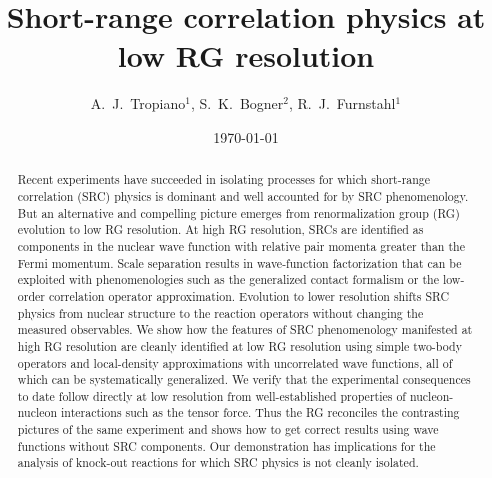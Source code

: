 \documentclass[10pt,aps,prc,floatfix,twocolumn,nofootinbib]{revtex4-1}
\begin{document}
\title{Short-range correlation physics at low RG resolution}


\author{A.~J.~Tropiano$^{1}$, S.~K.~Bogner$^{2}$, R.~J.~Furnstahl$^{1}$}


\date{\today}

\begin{abstract}
Recent experiments have succeeded in isolating processes for which short-range correlation (SRC) physics is dominant and well accounted for by SRC phenomenology.
But an alternative and compelling picture emerges from renormalization group (RG) evolution to low RG resolution.
At high RG resolution, SRCs are identified as components in the nuclear wave function with relative pair momenta greater than the Fermi momentum.
Scale separation results in wave-function factorization that can be exploited with phenomenologies such as the generalized contact formalism or the low-order correlation operator approximation. 
Evolution to lower resolution shifts SRC physics from nuclear structure to the reaction operators without changing the measured observables.
We show how the features of SRC phenomenology manifested at high RG resolution are cleanly identified 
at low RG resolution
using simple two-body operators and local-density approximations with uncorrelated wave functions,
all of which can be systematically generalized.
We verify that the experimental consequences to date follow directly at low resolution from well-established properties of nucleon-nucleon interactions such as the tensor force.
Thus the RG reconciles the contrasting pictures of the same experiment and shows how to get correct results using wave functions without SRC components.
Our demonstration has implications for the analysis of knock-out reactions for which SRC physics is not cleanly isolated.

\end{abstract}

\maketitle
\end{document}
